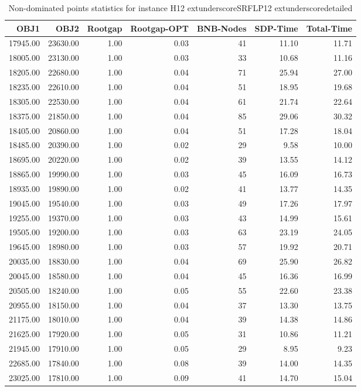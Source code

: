 \begin{table}
\caption{Non-dominated points statistics for instance H12	extunderscoreSRFLP12	extunderscoredetailed}
\label{tab:stats/H12_SRFLP12_detailed}
\begin{tabular}{rrrrrrr}
\toprule
OBJ1 & OBJ2 & Rootgap & Rootgap-OPT & BNB-Nodes & SDP-Time & Total-Time \\
\midrule
17945.00 & 23630.00 & 1.00 & 0.03 & 41 & 11.10 & 11.71 \\
18005.00 & 23130.00 & 1.00 & 0.03 & 33 & 10.68 & 11.16 \\
18205.00 & 22680.00 & 1.00 & 0.04 & 71 & 25.94 & 27.00 \\
18235.00 & 22610.00 & 1.00 & 0.04 & 51 & 18.95 & 19.68 \\
18305.00 & 22530.00 & 1.00 & 0.04 & 61 & 21.74 & 22.64 \\
18375.00 & 21850.00 & 1.00 & 0.04 & 85 & 29.06 & 30.32 \\
18405.00 & 20860.00 & 1.00 & 0.04 & 51 & 17.28 & 18.04 \\
18485.00 & 20390.00 & 1.00 & 0.02 & 29 & 9.58 & 10.00 \\
18695.00 & 20220.00 & 1.00 & 0.02 & 39 & 13.55 & 14.12 \\
18865.00 & 19990.00 & 1.00 & 0.03 & 45 & 16.09 & 16.73 \\
18935.00 & 19890.00 & 1.00 & 0.02 & 41 & 13.77 & 14.35 \\
19045.00 & 19540.00 & 1.00 & 0.03 & 49 & 17.26 & 17.97 \\
19255.00 & 19370.00 & 1.00 & 0.03 & 43 & 14.99 & 15.61 \\
19505.00 & 19200.00 & 1.00 & 0.03 & 63 & 23.19 & 24.05 \\
19645.00 & 18980.00 & 1.00 & 0.03 & 57 & 19.92 & 20.71 \\
20035.00 & 18830.00 & 1.00 & 0.04 & 69 & 25.90 & 26.82 \\
20045.00 & 18580.00 & 1.00 & 0.04 & 45 & 16.36 & 16.99 \\
20505.00 & 18240.00 & 1.00 & 0.05 & 55 & 22.60 & 23.38 \\
20955.00 & 18150.00 & 1.00 & 0.04 & 37 & 13.30 & 13.75 \\
21175.00 & 18010.00 & 1.00 & 0.04 & 39 & 14.38 & 14.86 \\
21625.00 & 17920.00 & 1.00 & 0.05 & 31 & 10.86 & 11.21 \\
21945.00 & 17910.00 & 1.00 & 0.05 & 29 & 8.95 & 9.23 \\
22685.00 & 17840.00 & 1.00 & 0.08 & 39 & 14.00 & 14.35 \\
23025.00 & 17810.00 & 1.00 & 0.09 & 41 & 14.70 & 15.04 \\
\bottomrule
\end{tabular}
\end{table}
